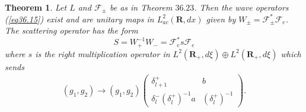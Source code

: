 \documentclass{surv-l}
\theoremstyle{plain}
\newtheorem{theorem}{Theorem}[section]
\theoremstyle{definition}
\numberwithin{equation}{chapter}
\begin{document}
\setcounter{theorem}{36}
\begin{theorem}\label{thm36.37} Let $L$ and $\mathscr{F}_{\pm}$ be as
in Theorem $36.23$. Then the wave operators \emph{(\ref{eq36.15})} exist and are unitary maps in $L_{ac}^{2}(\mathbf{R},dx)$ given by $W_{\pm}=\mathscr{F}_{\pm}^{*}\mathscr{F}_{e}$. The scattering operator has the form
\setcounter{equation}{37}
\begin{equation}\label{eq36.38}
S=W_{+}^{-1}W_{-}=\mathscr{F}_{e}^{*}s\mathscr{F}_{e}
\end{equation}
where $s$ is the right multiplication operator in $L^{2}(\mathbf{R}_{+},d\xi)\oplus L^{2}(\mathbf{R}_{+}, d\xi)$ which sends
\begin{align}\label{eq36.39}
(g_{1}, g_{2})\rightarrow(g_{1},g_{2})\left(
\begin{array}{cc}
\delta_{l+1}^{+} & b\\
\delta_{l}^{-}(\delta_{l}^{+})^{-1}a & (\delta_{l}^{+})^{-1}
\end{array}
\right).
\end{align}
\end{theorem}
\end{document}
